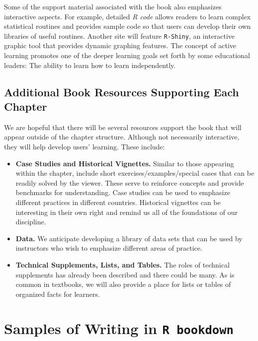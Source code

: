 \documentclass[]{book}
\providecommand{\tightlist}{%
  \setlength{\itemsep}{0pt}\setlength{\parskip}{0pt}}
\theoremstyle{definition}
\theoremstyle{definition}
\theoremstyle{definition}
\theoremstyle{remark}
\begin{document}
Some of the support material associated with the book also emphasizes
interactive aspects. For example, detailed \emph{R code} allows readers
to learn complex statistical routines and provides sample code so that
users can develop their own libraries of useful routines. Another site
will feature \texttt{R-Shiny}, an interactive graphic tool that provides
dynamic graphing features. The concept of active learning promotes one
of the deeper learning goals set forth by some educational leaders: The
ability to learn how to learn independently.

\section{Additional Book Resources Supporting Each
Chapter}\label{additional-book-resources-supporting-each-chapter}

We are hopeful that there will be several resources support the book
that will appear outside of the chapter structure. Although not
necessarily interactive, they will help develop users' learning. These
include:

\begin{itemize}
\tightlist
\item
  \textbf{Case Studies and Historical Vignettes.} Similar to those
  appearing within the chapter, include short exercises/examples/special
  cases that can be readily solved by the viewer. These serve to
  reinforce concepts and provide benchmarks for understanding. Case
  studies can be used to emphasize different practices in different
  countries. Historical vignettes can be interesting in their own right
  and remind us all of the foundations of our discipline.
\item
  \textbf{Data.} We anticipate developing a library of data sets that
  can be used by instructors who wish to emphasize different areas of
  practice.
\item
  \textbf{Technical Supplements, Lists, and Tables.} The roles of
  technical supplements has already been described and there could be
  many. As is common in textbooks, we will also provide a place for
  lists or tables of organized facts for learners.
\end{itemize}

\chapter{\texorpdfstring{Samples of Writing in
\texttt{R\ bookdown}}{Samples of Writing in R bookdown}}\label{S:SampleSection}
\end{document}
